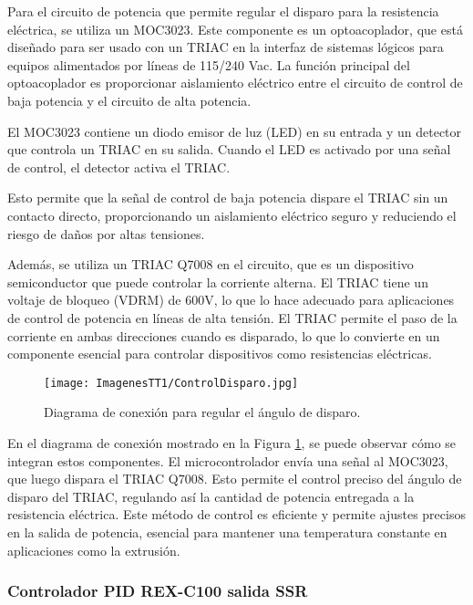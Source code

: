 \documentclass[14pt,oneside]{extarticle} %
\begin{document}
Para el circuito de potencia que permite regular el disparo para la resistencia eléctrica, se utiliza un MOC3023. Este componente es un optoacoplador, que está diseñado para ser usado con un TRIAC en la interfaz de sistemas lógicos para equipos alimentados por líneas de 115/240 Vac. La función principal del optoacoplador es proporcionar aislamiento eléctrico entre el circuito de control de baja potencia y el circuito de alta potencia.

El MOC3023 contiene un diodo emisor de luz (LED) en su entrada y un detector que controla un TRIAC en su salida. Cuando el LED es activado por una señal de control, el detector activa el TRIAC. 

Esto permite que la señal de control de baja potencia dispare el TRIAC sin un contacto directo, proporcionando un aislamiento eléctrico seguro y reduciendo el riesgo de daños por altas tensiones.

Además, se utiliza un TRIAC Q7008 en el circuito, que es un dispositivo semiconductor que puede controlar la corriente alterna. El TRIAC tiene un voltaje de bloqueo (VDRM) de 600V, lo que lo hace adecuado para aplicaciones de control de potencia en líneas de alta tensión. El TRIAC permite el paso de la corriente en ambas direcciones cuando es disparado, lo que lo convierte en un componente esencial para controlar dispositivos como resistencias eléctricas.

\begin{figure}[h!]
    \centering
    \texttt{[image: ImagenesTT1/ControlDisparo.jpg]}
    \caption{Diagrama de conexión para regular el ángulo de disparo.}
    \label{fig:triac_control}
\end{figure}

En el diagrama de conexión mostrado en la Figura \ref{fig:triac_control}, se puede observar cómo se integran estos componentes. El microcontrolador envía una señal al MOC3023, que luego dispara el TRIAC Q7008. Esto permite el control preciso del ángulo de disparo del TRIAC, regulando así la cantidad de potencia entregada a la resistencia eléctrica. Este método de control es eficiente y permite ajustes precisos en la salida de potencia, esencial para mantener una temperatura constante en aplicaciones como la extrusión.

\subsubsection{Controlador PID REX-C100 salida SSR}
\end{document}
